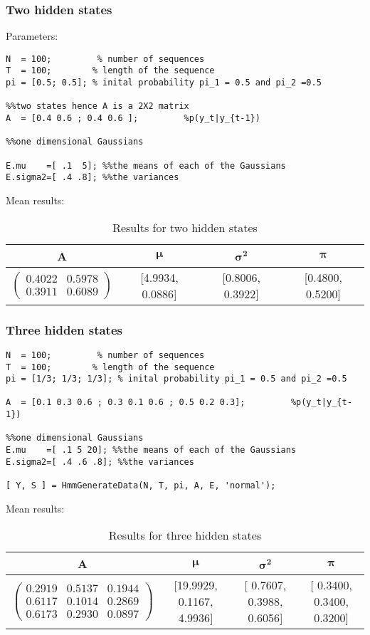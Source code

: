 \documentclass[10pt, a4paper]{article}
\begin{document}
\subsubsection{Two hidden states}
Parameters:
\begin{verbatim}
N  = 100;         % number of sequences
T  = 100;        % length of the sequence
pi = [0.5; 0.5]; % inital probability pi_1 = 0.5 and pi_2 =0.5

%%two states hence A is a 2X2 matrix 
A  = [0.4 0.6 ; 0.4 0.6 ];         %p(y_t|y_{t-1})

%%one dimensional Gaussians 

E.mu    =[ .1  5]; %%the means of each of the Gaussians
E.sigma2=[ .4 .8]; %%the variances
\end{verbatim}
Mean results:
\begin{table}[h]
\centering
\begin{tabular}{|c|c|c|c|}
\hline
\textbf{A} & $\mathbf{\mu}$ & $\mathbf{\sigma^2}$ & $\mathbf{\pi}$\\
\hline
$\begin{pmatrix}
0.4022  &  0.5978\\
0.3911  &  0.6089
\end{pmatrix}$ & [4.9934, 0.0886] & [0.8006, 0.3922] & [0.4800, 0.5200]\\
\hline
\end{tabular}
\caption{Results for two hidden states}
\end{table}

\subsubsection{Three hidden states}
\begin{verbatim}
N  = 100;         % number of sequences
T  = 100;        % length of the sequence
pi = [1/3; 1/3; 1/3]; % inital probability pi_1 = 0.5 and pi_2 =0.5

A  = [0.1 0.3 0.6 ; 0.3 0.1 0.6 ; 0.5 0.2 0.3];         %p(y_t|y_{t-1})

%%one dimensional Gaussians 
E.mu    =[ .1 5 20]; %%the means of each of the Gaussians
E.sigma2=[ .4 .6 .8]; %%the variances
    
[ Y, S ] = HmmGenerateData(N, T, pi, A, E, 'normal'); 
\end{verbatim}
Mean results:
\begin{table}[h]
\centering
\begin{tabular}{|c|c|c|c|}
\hline
\textbf{A} & $\mathbf{\mu}$ & $\mathbf{\sigma^2}$ & $\mathbf{\pi}$\\
\hline
$\begin{pmatrix}
0.2919  &  0.5137  &  0.1944\\
0.6117  &  0.1014  &  0.2869\\
0.6173  &  0.2930  &  0.0897
\end{pmatrix}$ & [19.9929, 0.1167, 4.9936] & [ 0.7607, 0.3988, 0.6056] & [  0.3400, 0.3400, 0.3200]\\
\hline
\end{tabular}
\caption{Results for three hidden states}
\end{table}
\end{document}
